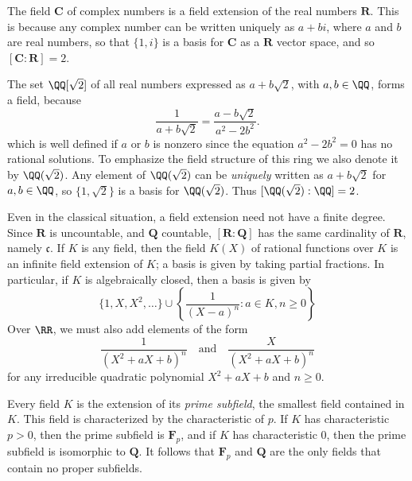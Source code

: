 \begin{example}
    The field $\mathbf{C}$ of complex numbers is a field extension of the real numbers $\mathbf{R}$. This is because any complex number can be written uniquely as $a + bi$, where $a$ and $b$ are real numbers, so that $\{ 1, i \}$ is a basis for $\mathbf{C}$ as a $\mathbf{R}$ vector space, and so $[\mathbf{C}: \mathbf{R}] = 2$.
\end{example}

\begin{example}
	The set $\QQ[\sqrt{2}]$ of all real numbers expressed as $a + b \sqrt{2}$, with $a,b \in \QQ$, forms a field, because
	\[ \frac{1}{a + b \sqrt{2}} = \frac{a - b \sqrt{2}}{a^2 - 2b^2}. \]
	which is well defined if $a$ or $b$ is nonzero since the equation $a^2 - 2b^2 = 0$ has no rational solutions. To emphasize the field structure of this ring we also denote it by $\QQ(\sqrt{2})$. Any element of $\QQ(\sqrt{2})$ can be \emph{uniquely} written as $a + b \sqrt{2}$ for $a,b \in \QQ$, so $\{ 1, \sqrt{2} \}$ is a basis for $\QQ(\sqrt{2})$. Thus $[\QQ(\sqrt{2}): \QQ] = 2$.
\end{example}

\begin{example}
	Even in the classical situation, a field extension need not have a finite degree. Since $\mathbf{R}$ is uncountable, and $\mathbf{Q}$ countable, $[\mathbf{R}: \mathbf{Q}]$ has the same cardinality of $\mathbf{R}$, namely $\mathfrak{c}$. If $K$ is any field, then the field $K(X)$ of rational functions over $K$ is an infinite field extension of $K$; a basis is given by taking partial fractions. In particular, if $K$ is algebraically closed, then a basis is given by
	\[ \{ 1, X, X^2, \dots \} \cup \left\{ \frac{1}{(X - a)^n}: a \in K, n \geq 0 \right\} \]
	Over $\RR$, we must also add elements of the form
	\[ \frac{1}{(X^2 + aX + b)^n} \quad\text{and}\quad \frac{X}{(X^2 + aX + b)^n} \]
	for any irreducible quadratic polynomial $X^2 + aX + b$ and $n \geq 0$.
\end{example}

\begin{example}
    Every field $K$ is the extension of its {\it prime subfield}, the smallest field contained in $K$. This field is characterized by the characteristic of $p$. If $K$ has characteristic $p > 0$, then the prime subfield is $\mathbf{F}_p$, and if $K$ has characteristic 0, then the prime subfield is isomorphic to $\mathbf{Q}$. It follows that $\mathbf{F}_p$ and $\mathbf{Q}$ are the only fields that contain no proper subfields.
\end{example}


